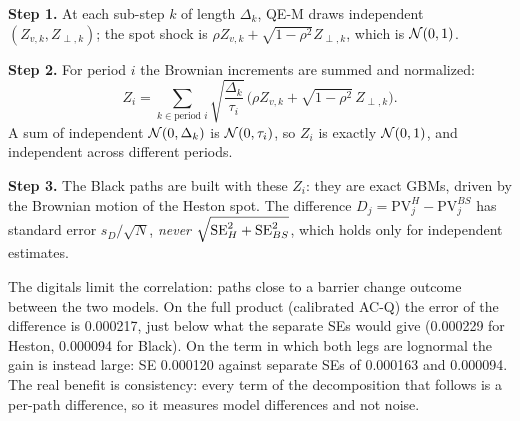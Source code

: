 \noindent\textbf{Step 1.} At each sub-step $k$ of length $\Delta_k$, QE-M draws independent $(Z_{v,k},Z_{\perp,k})$;
the spot shock is $\rho Z_{v,k}+\sqrt{1-\rho^2}Z_{\perp,k}$, which is $\mathcal{N}(0,1)$.

\noindent\textbf{Step 2.} For period $i$ the Brownian increments are summed and normalized:
\begin{equation}\label{eq:crn}
Z_i=\sum_{k\in\text{period }i}\sqrt{\frac{\Delta_k}{\tau_i}}\,\big(\rho Z_{v,k}+\sqrt{1-\rho^2}\,Z_{\perp,k}\big).
\end{equation}
A sum of independent $\mathcal{N}(0,\Delta_k)$ is $\mathcal{N}(0,\tau_i)$, so $Z_i$ is exactly $\mathcal{N}(0,1)$, and independent across
different periods.

\noindent\textbf{Step 3.} The Black paths are built with these $Z_i$: they are exact GBMs, driven by the Brownian
motion of the Heston spot. The difference $D_j=\mathrm{PV}^H_j-\mathrm{PV}^{BS}_j$ has standard error $s_D/\sqrt N$,
\emph{never} $\sqrt{\mathrm{SE}_H^2+\mathrm{SE}_{BS}^2}$, which holds only for independent estimates.

\begin{attenzione}[title={The gain is modest, and that is fine}]
The digitals limit the correlation: paths close to a barrier change outcome between the two models. On the full
product (calibrated \mbox{AC-Q}) the error of the difference is 0.000217, just below what the separate SEs would give
(0.000229 for Heston, 0.000094 for Black). On the term in which both legs are lognormal the gain is instead large: SE
0.000120 against separate SEs of 0.000163 and 0.000094. The real benefit is consistency: every term of the
decomposition that follows is a per-path difference, so it measures model differences and not noise.
\end{attenzione}


